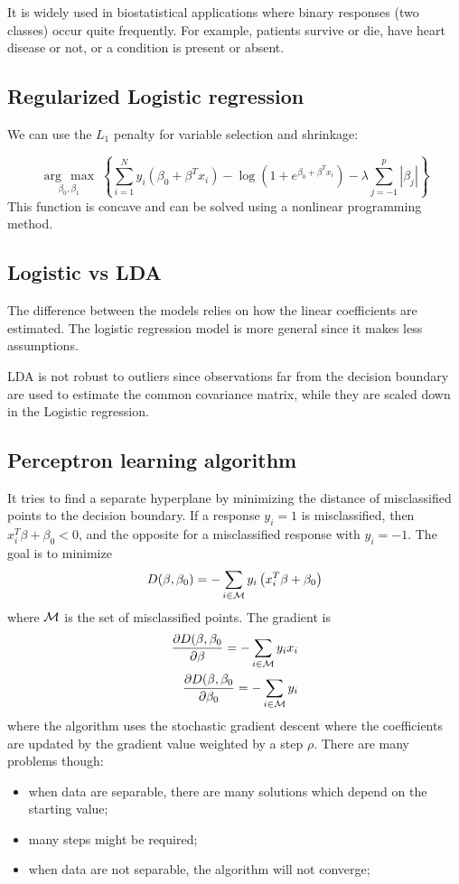 \documentclass[12pt, letterpaper]{article}
\theoremstyle{definition}
\newcommand{\argmax}[1]{\underset{#1}{\operatorname{arg}\,\operatorname{max}}\;}
\begin{document}
It is widely used in biostatistical applications where binary responses (two classes) occur quite frequently. For example, patients survive or die, have heart disease or not, or a condition is present or absent.

\subsection{Regularized Logistic regression}
We can use the $L_1$ penalty for variable selection and shrinkage:

\begin{equation}
\argmax{\beta_0,\beta_1} \left\lbrace \sum_{i=1}^N y_i\left(  \beta_0 + \beta^Tx_i\right) -\log \left( 1+e^{\beta_0 + \beta^T x_i}\right) -\lambda \sum_{j=-1}^p |\beta_j|\right\rbrace
\end{equation}
This function is concave and can be solved using a nonlinear programming method.
\subsection{Logistic vs LDA}
The difference between the models relies on how the linear coefficients are estimated. The logistic regression model is more general since it makes less assumptions.

LDA is not robust to outliers since observations far from the decision boundary are used to estimate the common covariance matrix, while they are scaled down in the Logistic regression.

\subsection{Perceptron learning algorithm}
It tries to find a separate hyperplane by minimizing the distance of misclassified points to the decision boundary. If a response $y_i = 1$ is misclassified, then $x^T_i \beta + \beta_0 < 0$, and the opposite for a misclassified response with $y_i = -1$. The goal is to minimize
\begin{equation}
D(\beta, \beta_0) = - \sum_{i\in\CMcal{M}} y_i\left(x_i^T\beta + \beta_0\right)
\end{equation}
where $\CMcal{M}$ is the set of misclassified points.
The gradient is
\begin{align}
\frac{\partial D(\beta,\beta_0}{\partial \beta} = -\sum_{i\in\CMcal{M}}y_ix_i \\
\frac{\partial D(\beta,\beta_0}{\partial \beta_0} = -\sum_{i\in\CMcal{M}} y_i
\end{align}
where the algorithm uses the stochastic gradient descent where the coefficients are updated by the gradient value weighted by a step $\rho$. There are many problems though:
\begin{itemize}
\item when data are separable, there are many solutions which depend on the starting value;
\item many steps might be required;
\item when data are not separable, the algorithm will not converge;
\end{itemize}
\end{document}
